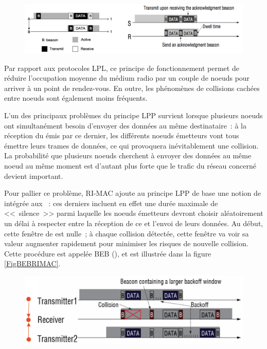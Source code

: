\begin{figure}[!hbt]
\centering
\includegraphics[width=14cm]{images/ch3-lpp.png}
\label{FigPrincipeLPP}
\end{figure}

Par rapport aux protocoles LPL, ce principe de fonctionnement permet
de réduire l'occupation moyenne du médium radio par un couple de
noeuds pour arriver à un point de rendez-vous.
En outre, les phénomènes de collisions cachées entre noeuds sont
également moins fréquents.

L'un des principaux problèmes du principe LPP survient lorsque
plusieurs noeuds ont simultanément besoin d'envoyer des données
au même destinataire~: à la réception du  émis par ce
dernier, les différents noeuds émetteurs vont tous émettre leurs
trames de données, ce qui provoquera inévitablement une collision.
La probabilité que plusieurs noeuds cherchent à envoyer des données
au même noeud au même moment est d'autant plus forte que le trafic
du réseau concerné devient important.

Pour pallier ce problème, RI-MAC ajoute au principe LPP de base
une notion de  intégrée aux ~:
ces derniers incluent en effet une durée maximale de <<~silence~>>
parmi laquelle les noeuds émetteurs devront choisir aléatoirement
un délai à respecter entre la réception de ce  et
l'envoi de leurs données. Au début, cette fenêtre de 
est nulle~; à chaque collision détectée, cette fenêtre va voir
sa valeur augmenter rapidement pour minimiser les risques de nouvelle
collision. Cette procédure est appelée BEB (), et est illustrée dans la figure \vref{FigBEBRIMAC}.

\begin{figure}[!hbt]
\centering
\includegraphics[width=12.5cm]{images/ch3-ri-mac-backoff.png}
\label{FigBEBRIMAC}
\end{figure}

